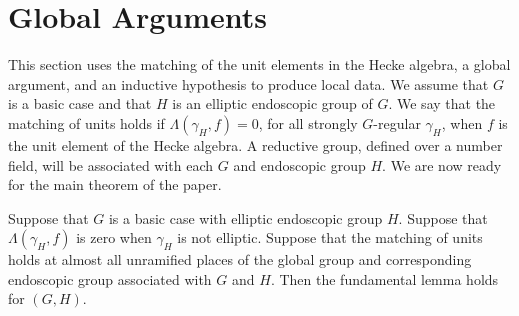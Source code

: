 \documentclass{amsart}
\newenvironment{cthm}[1]
  {\renewcommand\thethm{\sc #1}\thm}
  {\endthm}
\begin{document}
\section{Global Arguments }%

This section uses the
matching of the unit elements in the Hecke algebra, 
a global argument, and an inductive hypothesis to
produce local data.  We assume that $G$ is a basic case
and that $H$ is an elliptic endoscopic group of $G$.
 We say that the matching of units holds if 
$\Lambda(\gamma_H,f)=0$, for all strongly $G$-regular
$\gamma_H$, when $f$ is the unit element of the
Hecke algebra.  A reductive group, defined over a number field,
will be associated with each $G$ and endoscopic group $H$.
We are now ready for the main theorem of the paper.

\begin{cthm}{Theorem 6.1}  Suppose that $G$ is a basic case with
elliptic endoscopic group $H$.  
Suppose that $\Lambda(\gamma_H,f)$ is zero
when $\gamma_H$ is not elliptic.  
Suppose that the matching of units holds
at almost all unramified places of the global group and corresponding
endoscopic group associated with
$G$ and $H$.  Then the fundamental lemma holds for $(G,H)$.
\end{cthm}
\end{document}
